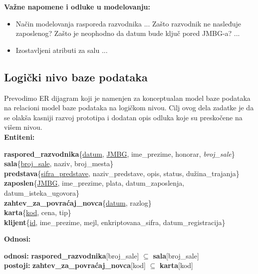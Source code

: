 \documentclass[a4paper]{article}
\begin{document}
\noindent\textbf{Važne napomene i odluke u modelovanju:}
\begin{itemize}
  \item Način modelovanja rasporeda razvodnika ... Zašto razvodnik ne nasleđuje zaposlenog? Zašto 
        je neophodno da datum bude ključ pored JMBG-a? ...
  \item Izostavljeni atributi za salu ...
\end{itemize}

\subsection{Logički nivo baze podataka}

Prevodimo ER dijagram koji je namenjen za konceptualan model baze podataka na relacioni model baze
podataka na logičkom nivou. Cilj ovog dela zadatke je da se olakša kasniji razvoj prototipa i dodatan
opis odluka koje su preskočene na višem nivou. \\

\noindent\textbf{Entiteni:}

\textbf{raspored\_razvodnika}\{\underline{datum}, \underline{JMBG}, ime\_prezime, honorar, \textit{broj\_sale}\}\\

\textbf{sala}\{\underline{broj\_sale}, naziv, broj\_mesta\}\\

\textbf{predstava}\{\underline{sifra\_predstave}, naziv\_predstave, opis, status, dužina\_trajanja\}\\

\textbf{zaposlen}\{\underline{JMBG}, ime\_prezime, plata, datum\_zaposlenja, datum\_isteka\_ugovora\}\\

\textbf{zahtev\_za\_povraćaj\_novca}\{\underline{datum}, razlog\}\\

\textbf{karta}\{\underline{kod}, cena, tip\}\\

\textbf{klijent}\{\underline{id}, ime\_prezime, mejl, enkriptovana\_sifra, datum\_registracija\}  

\noindent\textbf{Odnosi:}

\textbf{odnosi:} \textbf{raspored\_razvodnika}[broj\_sale] $\subseteq$ \textbf{sala}[broj\_sale]\\

\textbf{postoji:} \textbf{zahtev\_za\_povraćaj\_novca}[kod] $\subseteq$ \textbf{karta}[kod]\\
\end{document}
